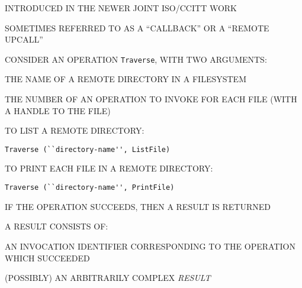 \begin{bwslide}

\begin{nrtc}
\item	INTRODUCED IN THE NEWER JOINT ISO/CCITT WORK

\item	SOMETIMES REFERRED TO AS A ``CALLBACK'' OR A ``REMOTE UPCALL''
\end{nrtc}
\end{bwslide}


\begin{bwslide}

\begin{nrtc}
\item	CONSIDER AN OPERATION \verb"Traverse", WITH TWO ARGUMENTS:
    \begin{nrtc}
    \item	THE NAME OF A REMOTE DIRECTORY IN A FILESYSTEM

    \item	THE NUMBER OF AN OPERATION TO INVOKE FOR EACH FILE
		(WITH A HANDLE TO THE FILE)
    \end{nrtc}

\item	TO LIST A REMOTE DIRECTORY:
\begin{verbatim}
Traverse (``directory-name'', ListFile)
\end{verbatim}

\item	TO PRINT EACH FILE IN A REMOTE DIRECTORY:
\begin{verbatim}
Traverse (``directory-name'', PrintFile)
\end{verbatim}
\end{nrtc}
\end{bwslide}


\begin{bwslide}

\begin{nrtc}
\item	IF THE OPERATION SUCCEEDS, THEN A RESULT IS RETURNED

\item	A RESULT CONSISTS OF:
    \begin{nrtc}
    \item	AN INVOCATION IDENTIFIER CORRESPONDING TO THE OPERATION WHICH
		SUCCEEDED

    \item	(POSSIBLY) AN ARBITRARILY COMPLEX \emph{RESULT}
    \end{nrtc}
\end{nrtc}
\end{bwslide}



